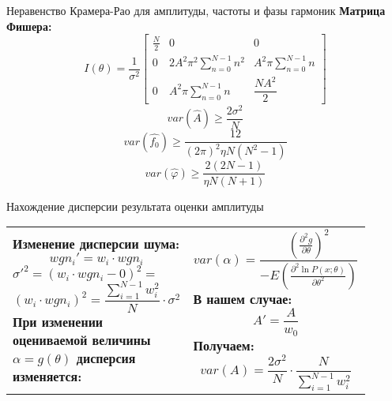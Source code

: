 \begin{frame}{Неравенство Крамера-Рао для амплитуды, частоты и фазы гармоник}
\textbf{Матрица Фишера:}
\begin{equation}
\label{eq:equation15}
I(\theta) = \frac{1}{\sigma^2}
\begin{bmatrix}
	\frac{N}{2} & 0 & 0 \\
	0 & 2A^2 \pi^2 \displaystyle\sum_{n=0}^{N-1} n^2 & A^2 \pi \displaystyle\sum_{n=0}^{N-1} n \\
	0 & A^2 \pi \displaystyle\sum_{n=0}^{N-1} n & \dfrac{NA^2}{2}
\end{bmatrix}
\end{equation}
\begin{equation}
\label{eq:equation16}
var(\hat{A})\geq \frac{2  \sigma^2}{N} 
\end{equation}
\begin{equation}
\label{eq:equation17}
var(\hat{f_0})\geq \frac{12}{(2\pi)^2 \eta  N(N^2 - 1)}  
\end{equation}
\begin{equation}
\label{eq:equation18}
var(\hat{\varphi})\geq \frac{2(2N-1)}{\eta N(N+1)}  
\end{equation}
\end{frame}

\begin{frame}{Нахождение дисперсии результата оценки амплитуды}
\begin{tabular}{m{0.45\linewidth}m{0.45\linewidth}}
\textbf{Изменение дисперсии шума:}
\begin{equation}
\label{eq:equation19}
w g {n_i}' = w_i \cdot w g n_i
\end{equation}
${\sigma '}^2 = (w_i \cdot w g n_i - 0)^2=$
\begin{equation}
\label{eq:equation19}
(w_i \cdot w g n_i)^2 =\frac{\displaystyle\sum_{i=1}^{N-1} w_i^2}{N} \cdot \sigma^2
\end{equation}
\textbf{При изменении оцениваемой величины $\alpha=g(\theta)$ дисперсия изменяется:}

&
\begin{equation}
	\label{eq:equation19}
	var (\alpha) = \frac{ \left({\frac{\partial^2 g}{\partial \theta}}\right)^2}{-E \left(\frac{\partial ^2 \ln P(x; \theta)}{\partial \theta^2} \right) }
\end{equation}
\textbf{В нашем случае:}
\begin{equation}
\label{eq:equation19}
A'= \frac{A}{w_0}
\end{equation}
\textbf{Получаем:}
\begin{equation}
	\label{eq:equation19}
	var(A)= \frac{2\sigma^2}{N}\cdot \frac{N}{\displaystyle\sum_{i=1}^{N-1} w_i^2}
\end{equation}
\end{tabular}
\end{frame}


